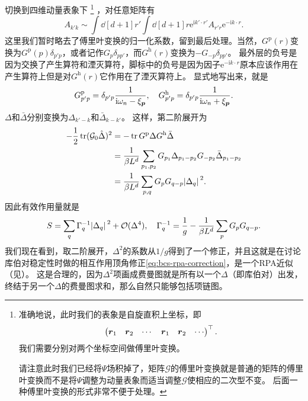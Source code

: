 \documentclass[hyperref, UTF8, a4paper]{ctexart}
\newcommand*{\ii}{\mathrm{i}}
\newcommand*{\ee}{\mathrm{e}}
\newcommand*{\bigO}{\mathcal{O}}
\begin{document}
切换到四维动量表象下%
\footnote{
    准确地说，此时我们的表象是自旋直积上坐标，即
    \[
        \pmqty{ \vb*{r}_1 & \vb*{r}_2 & \cdots & \vb*{r}_1 & \vb*{r}_2 & \cdots }^\top.
    \]
    我们需要分别对两个坐标空间做傅里叶变换。

    请注意此时我们已经将$\Psi$场积掉了，矩阵$\mathcal{G}$的傅里叶变换就是普通的矩阵的傅里叶变换而不是将$\Psi$调整为动量表象而适当调整$\mathcal{G}$使相应的二次型不变。
    后面一种傅里叶变换的形式非常不便于处理。
}%
，对任意矩阵有
\[
    A_{k' k} \sim \int \dd[d+1]{r'} \int \dd[d+1]{r} \ee^{\ii k' \cdot r'} A_{r' r} \ee^{- \ii k \cdot r}.
\]
这里我们暂时略去了傅里叶变换的归一化系数，留到最后处理。当然，$G^\text{p}(r)$变换为$G^\text{p}(p) \delta_{p'p}$，或者记作$G_p \delta_{pp'}$，而$G^\text{h}(r)$变换为$-G_{-p} \delta_{pp'}$。
最外层的负号是因为交换了产生算符和湮灭算符，脚标中的负号是因为因子$\ee^{-\ii k \cdot r}$原本应该作用在产生算符上但是对$G^\text{h}(r)$它作用在了湮灭算符上。
显式地写出来，就是
\[
    G^\text{p}_{p' p} = \delta_{p' p} \frac{1}{\ii \omega_n - \xi_{\vb*{p}}}, \quad G^\text{h}_{p' p} = \delta_{p' p} \frac{1}{\ii \omega_n + \xi_{\vb*{p}}}.
\]
$\Delta$和$\bar{\Delta}$分别变换为$\Delta_{k'-k}$和$\bar{\Delta}_{k-k'}$。
这样，第二阶展开为
\[
    \begin{aligned}
        - \frac{1}{2} \trace (\mathcal{G}_0 \hat{\Delta})^2 &= - \trace G^\text{p} \Delta G^\text{h} \bar{\Delta} \\
        &= \frac{1}{\beta L^d} \sum_{p_1, p_2} G_{p_1} \Delta_{p_1-p_2} G_{-p_2} \bar{\Delta}_{p_1-p_2} \\
        &= \frac{1}{\beta L^d} \sum_{p, q} G_p G_{q-p} \abs*{\Delta_q}^2.
    \end{aligned}
\]
因此有效作用量就是
\begin{equation}
    S = \sum_q \Gamma_q^{-1} \abs*{\Delta_q}^2 + \bigO(\Delta^4), \quad \Gamma_q^{-1} = \frac{1}{g} - \frac{1}{\beta L^d} \sum_{p} G_p G_{q-p}.
\end{equation}
我们现在看到，取二阶展开，$\Delta^2$的系数从$1/g$得到了一个修正，并且这就是在讨论库伯对稳定性时做的相互作用顶角修正\eqref{eq:bcs-rpa-correction}，是一个RPA近似（见）。
这是合理的，因为$\Delta^2$项画成费曼图就是所有以一个$\Delta$（即库伯对）出发，终结于另一个$\Delta$的费曼图求和，那么自然只能够包括项链图。
\end{document}
